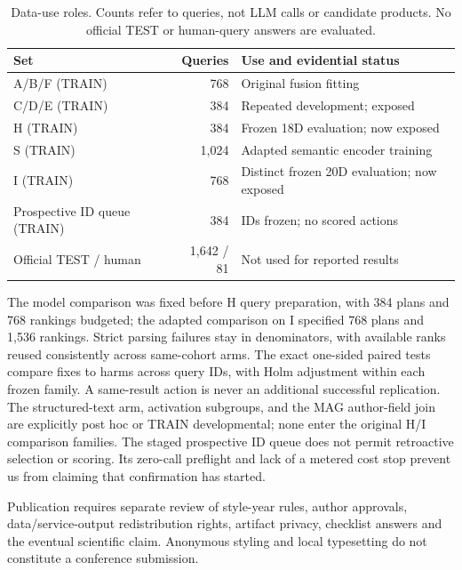 \documentclass{article}
\begin{document}
\begin{table}[h]
\centering
\caption{Data-use roles. Counts refer to queries, not LLM calls or candidate
products. No official TEST or human-query answers are evaluated.}
\label{tab:roles}
\small
\begin{tabular}{lrl}
\toprule
Set & Queries & Use and evidential status \\
\midrule
A/B/F (TRAIN) & 768 & Original fusion fitting \\
C/D/E (TRAIN) & 384 & Repeated development; exposed \\
H (TRAIN) & 384 & Frozen 18D evaluation; now exposed \\
S (TRAIN) & 1,024 & Adapted semantic encoder training \\
I (TRAIN) & 768 & Distinct frozen 20D evaluation; now exposed \\
Prospective ID queue (TRAIN) & 384 & IDs frozen; no scored actions \\
Official TEST / human & 1,642 / 81 & Not used for reported results \\
\bottomrule
\end{tabular}
\end{table}

The model comparison was fixed before H query preparation, with 384 plans
and 768 rankings budgeted; the adapted comparison on I specified 768 plans
and 1,536 rankings. Strict parsing failures stay in denominators, with
available ranks reused consistently across same-cohort arms. The exact
one-sided paired tests compare fixes to harms across query IDs, with Holm
adjustment within each frozen family. A same-result action is never an
additional successful replication. The structured-text arm, activation
subgroups, and the MAG author-field join are explicitly post hoc or TRAIN
developmental; none enter the original H/I comparison families. The staged
prospective ID queue does not permit retroactive selection or scoring. Its
zero-call preflight and lack of a metered cost stop prevent us from claiming
that confirmation has started.

Publication requires separate review of style-year rules, author approvals,
data/service-output redistribution rights, artifact privacy, checklist
answers and the eventual scientific claim. Anonymous styling and local
typesetting do not constitute a conference submission.

\end{document}
